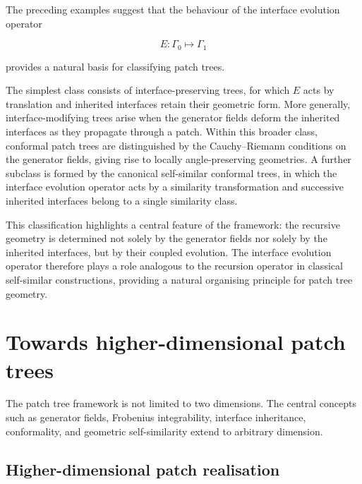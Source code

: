 \documentclass[11pt,a4paper]{article}
\begin{document}
The preceding examples suggest that the behaviour of the interface
evolution operator

\[
E:\Gamma_0 \mapsto \Gamma_1
\]

provides a natural basis for classifying patch trees.

The simplest class consists of interface-preserving trees, for which
\(E\) acts by translation and inherited interfaces retain their
geometric form. More generally, interface-modifying trees arise when
the generator fields deform the inherited interfaces as they propagate
through a patch. Within this broader class, conformal patch trees are
distinguished by the Cauchy--Riemann conditions on the generator
fields, giving rise to locally angle-preserving geometries. A further
subclass is formed by the canonical self-similar conformal trees, in
which the interface evolution operator acts by a similarity
transformation and successive inherited interfaces belong to a single
similarity class.

This classification highlights a central feature of the framework:
the recursive geometry is determined not solely by the generator
fields nor solely by the inherited interfaces, but by their coupled
evolution. The interface evolution operator therefore plays a role
analogous to the recursion operator in classical self-similar
constructions, providing a natural organising principle for patch
tree geometry.




\section{Towards higher-dimensional patch trees}
\label{sec:agn}

The patch tree framework is not limited to two dimensions. The
central concepts such as generator fields, Frobenius integrability,
interface inheritance, conformality, and geometric
self-similarity extend to arbitrary dimension. 

\subsection{Higher-dimensional patch realisation}
\label{sec:agn_realization}
\end{document}
